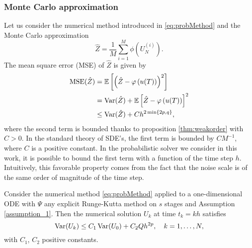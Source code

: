 \subsubsection{Monte Carlo approximation}\label{sec:MonteCarlo}

Let us consider the numerical method introduced in \eqref{eq:probMethod} and the Monte Carlo approximation 
\begin{equation}\label{eq:MCapproximation}
\hat Z = \frac{1}{M} \sum_{i = 1}^M \phi\left(U_N^{(i)}\right).
\end{equation}
The mean square error (MSE) of $\hat Z$ is given by
\begin{equation}\label{eq:MCMSE}
\begin{aligned}
	\operatorname{MSE}(\hat Z) &= \mathbb{E}\left[\left(\hat Z - \varphi\left(u(T)\right)\right)^2\right] \\
	&= \operatorname{Var}(\hat Z) + \mathbb{E}\left[\hat Z - \varphi\left(u(T)\right)\right]^2 \\
	&\leq \operatorname{Var}(\hat Z) + C h^{2\min\{2p, q\}},
\end{aligned}
\end{equation} 
where the second term is bounded thanks to proposition \ref{thm:weakorder} with $C > 0$. In the standard theory of SDE's, the first term is bounded by $CM^{-1}$, where $C$ is a positive constant. In the probabilistic solver we consider in this work, it is possible to bound the first term with a function of the time step $h$. Intuitively, this favorable property comes from the fact that the noise scale is of the same order of magnitude of the time step. 
\begin{lemma}\label{lem:varMC} Consider the numerical method \eqref{eq:probMethod} applied to a one-dimensional ODE with $\Psi$ any explicit Runge-Kutta method on $s$ stages and Assumption \ref{assumption_1}. Then the numerical solution $U_k$ at time $t_k = kh$ satisfies
\begin{equation}
	\operatorname{Var}(U_k) \leq C_1\operatorname{Var}(U_0) + C_2Q h^{2p}, \quad k = 1, \ldots, N,
\end{equation}
with $C_1$, $C_2$ positive constants.
\end{lemma}
